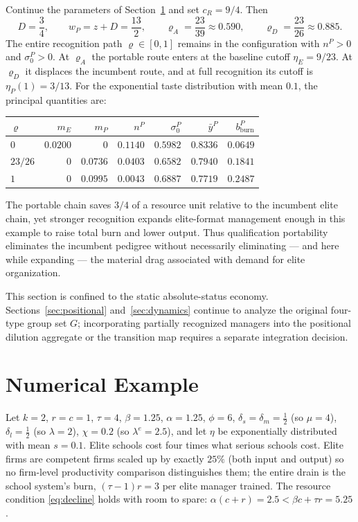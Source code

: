 \documentclass[12pt,letterpaper]{article}
\theoremstyle{definition}
\begin{document}
Continue the parameters of Section~\ref{sec:example} and set $c_R=9/4$.
Then
\[
  D=\frac34,
  \qquad
  w_P=z+D=\frac{13}{2},
  \qquad
  \varrho_A=\frac{23}{39}\approx0.590,
  \qquad
  \varrho_D=\frac{23}{26}\approx0.885 .
\]
The entire recognition path $\varrho\in[0,1]$ remains in the configuration with
$n^P>0$ and $\sigma_0^P>0$.
At $\varrho_A$ the portable route enters at the baseline cutoff
$\eta_E=9/23$.
At $\varrho_D$ it displaces the incumbent route, and at full recognition its cutoff is
$\eta_P(1)=3/13$.
For the exponential taste distribution with mean $0.1$, the principal quantities are:
\begin{center}
{\small
\begin{tabular}{lrrrrrr}
\toprule
$\varrho$ & $m_E$ & $m_P$ & $n^P$ & $\sigma_0^P$ & $\bar y^P$
& $b_{\mathrm{burn}}^P$\\
\midrule
$0$ & $0.0200$ & $0$ & $0.1140$ & $0.5982$ & $0.8336$ & $0.0649$\\
$23/26$ & $0$ & $0.0736$ & $0.0403$ & $0.6582$ & $0.7940$ & $0.1841$\\
$1$ & $0$ & $0.0995$ & $0.0043$ & $0.6887$ & $0.7719$ & $0.2487$\\
\bottomrule
\end{tabular}
}
\end{center}
The portable chain saves $3/4$ of a resource unit relative to the incumbent elite chain,
yet stronger recognition expands elite-format management enough in this example to raise
total burn and lower output.
Thus qualification portability eliminates the incumbent pedigree without necessarily
eliminating --- and here while expanding --- the material drag associated with demand for
elite organization.

This section is confined to the static absolute-status economy.
Sections~\ref{sec:positional} and~\ref{sec:dynamics} continue to analyze the original
four-type group set $G$; incorporating partially recognized managers into the positional
dilution aggregate or the transition map requires a separate integration decision.

\section{Numerical Example}\label{sec:example}

Let $k=2$, $r=c=1$, $\tau=4$, $\beta=1.25$, $\alpha=1.25$, $\phi=6$, $\delta_s=\delta_m=\tfrac12$ (so $\mu=4$), $\delta_l=\tfrac12$ (so $\lambda=2$), $\chi=0.2$ (so $\lambda^{e}=2.5$), and let $\eta$ be exponentially distributed with mean $s=0.1$.
Elite schools cost four times what serious schools cost.
Elite firms are competent firms scaled up by exactly $25\%$ (both input and output) so no firm-level productivity comparison distinguishes them; the entire drain is the school system's burn, $(\tau-1)r=3$ per elite manager trained.
The resource condition \eqref{eq:decline} holds with room to spare: $\alpha(c+r)=2.5 < \beta c+\tau r = 5.25$.
\end{document}
